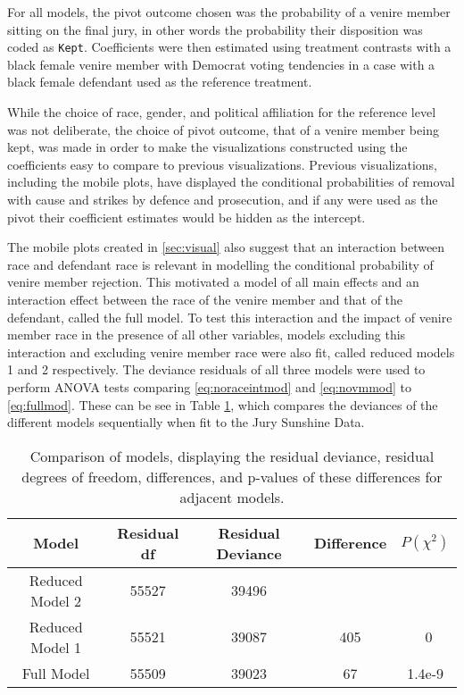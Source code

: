 For all models, the pivot outcome chosen was the probability of a
venire member sitting on the final jury, in other words the probability their disposition was coded as \texttt{Kept}. Coefficients were
then estimated using treatment contrasts with a black female venire member with Democrat voting tendencies in a case with a black female
defendant used as the reference treatment.

While the choice of race, gender, and political affiliation for the reference level was not deliberate, the choice of pivot
outcome, that of a venire member being kept, was made in order to make the visualizations constructed using the coefficients easy to compare to previous visualizations. Previous visualizations, including the mobile plots, have displayed the
conditional probabilities of removal with cause and strikes by defence and prosecution, and if any were used as the pivot their
coefficient estimates would be hidden as the intercept.

The mobile plots created in \ref{sec:visual} also suggest that an interaction between race and
defendant race is relevant in modelling the conditional probability of venire member rejection. This motivated a model of all main effects and an interaction effect between the race of the venire member and that of the defendant, called the full model. To test this interaction and the impact of venire member race in the presence of all other variables, models excluding this interaction and excluding venire member race were also fit, called reduced models 1 and 2 respectively. The deviance residuals of all three models were used to perform ANOVA tests comparing \ref{eq:noraceintmod} and \ref{eq:novmmod} to \ref{eq:fullmod}. These can be see in Table \ref{tab:modcomp}, which compares the deviances of the different models sequentially when fit to the Jury Sunshine Data.

\begin{table}[h!]
  \centering
  \caption[Nested ANOVA Table Demonstrating the Importance of
  Race]{\footnotesize Comparison of models, displaying the residual deviance, residual degrees of freedom, differences, and p-values of these
    differences for adjacent models.}
  \label{tab:modcomp}
  \begin{tabular}{|c|c|c|c|c|} \hline
    Model & Residual df & Residual Deviance & Difference & $P(\chi^2)$ \\ \hline
    Reduced Model 2 & 55527 & 39496 &  &  \\
    Reduced Model 1 & 55521 & 39087 & 405 & ~0 \\
    Full Model & 55509 & 39023 & 67 & 1.4e-9 \\ \hline
  \end{tabular}
\end{table}

